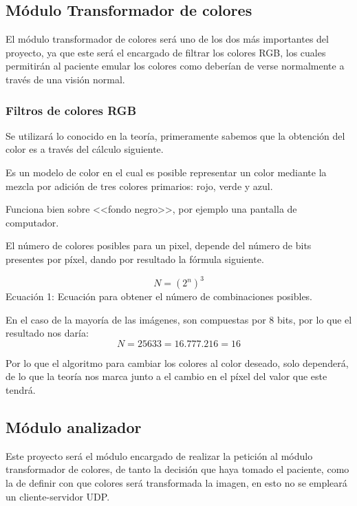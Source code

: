 \documentclass[10pt]{article}
\begin{document}
\subsection{Módulo Transformador de colores}
El módulo transformador de colores será uno de los dos más importantes del proyecto, ya que este será el encargado de filtrar los colores RGB, los cuales permitirán al paciente emular los colores como deberían de verse normalmente a través de una visión normal.

\subsubsection{Filtros de colores RGB}

Se utilizará lo conocido en la teoría, primeramente sabemos que la obtención del color es a través del cálculo siguiente.

Es un modelo de color en el cual es posible representar un color mediante la mezcla por adición de tres colores primarios: rojo, verde y azul\cite{IEEEreferencias:Ref43}.

Funciona bien sobre <<fondo negro>>, por ejemplo una pantalla de computador\cite{IEEEreferencias:Ref43}.

El número de colores posibles para un pixel, depende del número de bits presentes por píxel, dando por resultado la fórmula siguiente.

\begin{equation}\label{ecuacion 1}
N = (2^n)^3
\end{equation}
Ecuación 1: Ecuación para obtener el número de combinaciones posibles.

En el caso de la mayoría de las imágenes, son compuestas por 8 bits, por lo que el resultado nos daría:
\newline
\begin{equation}\label{ecuacion2}
N=25633=16.777.216=16 
\end{equation}

\setlength{\parskip}{2mm}
Por lo que el algoritmo para cambiar los colores al color deseado, solo dependerá, de lo que la teoría nos marca junto a el cambio en el píxel del valor que este tendrá.
\subsection{Módulo analizador}

Este proyecto será el módulo encargado de realizar la petición al módulo transformador de colores, de tanto la decisión que haya tomado el paciente, como la de definir con que colores será transformada la imagen, en esto no se empleará un cliente-servidor UDP.
\end{document}
